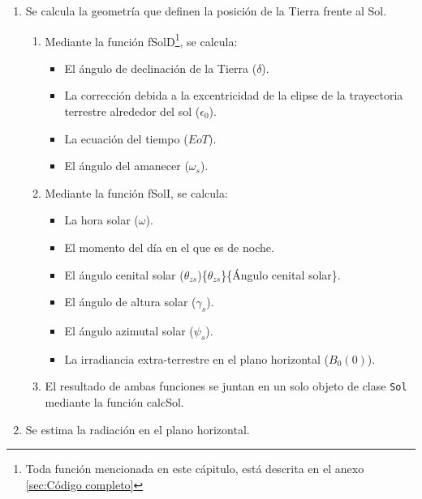 \begin{enumerate}
\item Se calcula la geometría que definen la posición de la Tierra frente al Sol.
\begin{enumerate}
\item Mediante la función fSolD\footnote{Toda función mencionada en este cápitulo, está descrita en el anexo \ref{sec:Código completo}}, se calcula:
\begin{itemize}
\item El ángulo de declinación de la Tierra (\(\delta\)).
\item La corrección debida a la excentricidad de la elipse de la trayectoria terrestre alrededor del sol (\(\epsilon_0\)).
\item La ecuación del tiempo (\(EoT\)).
\item El ángulo del amanecer (\(\omega_s\)).
\end{itemize}
\item Mediante la función fSolI, se calcula:
\begin{itemize}
\item La hora solar (\(\omega\)).
\item El momento del día en el que es de noche.
\item El ángulo cenital solar (\(\theta_{zs}\))\nomenclature[thetazs]\{\(\theta_{zs}\)\}\{Ángulo cenital solar\}.
\item El ángulo de altura solar (\(\gamma_s\)).
\item El ángulo azimutal solar (\(\psi_s\)).
\item La irradiancia extra-terrestre en el plano horizontal (\(B_0(0)\)).
\end{itemize}
\item El resultado de ambas funciones se juntan en un solo objeto de clase \texttt{Sol} mediante la función calcSol.
\end{enumerate}
\item Se estima la radiación en el plano horizontal.

\end{enumerate}
